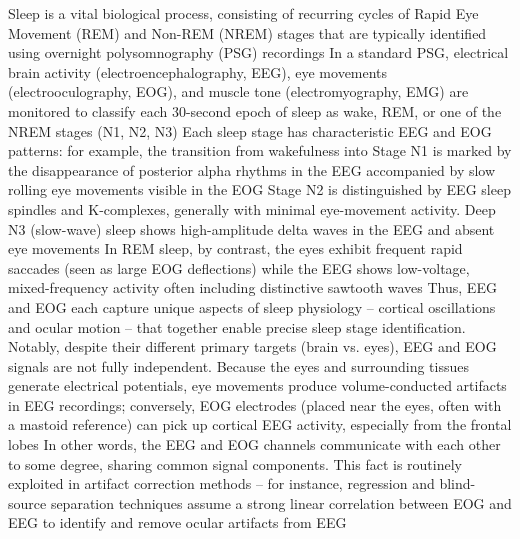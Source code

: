 Sleep is a vital biological process, consisting of recurring cycles of Rapid Eye Movement (REM) and Non-REM (NREM) stages that are typically identified using overnight polysomnography (PSG) recordings %
In a standard PSG, electrical brain activity (electroencephalography, EEG), eye movements (electrooculography, EOG), and muscle tone (electromyography, EMG) are monitored to classify each 30-second epoch of sleep as wake, REM, or one of the NREM stages (N1, N2, N3) %
Each sleep stage has characteristic EEG and EOG patterns: for example, the transition from wakefulness into Stage N1 is marked by the disappearance of posterior alpha rhythms in the EEG accompanied by slow rolling eye movements visible in the EOG %
Stage N2 is distinguished by EEG sleep spindles and K-complexes, generally with minimal eye-movement activity. Deep N3 (slow-wave) sleep shows high-amplitude delta waves in the EEG and absent eye movements %
In REM sleep, by contrast, the eyes exhibit frequent rapid saccades (seen as large EOG deflections) while the EEG shows low-voltage, mixed-frequency activity often including distinctive sawtooth waves %
Thus, EEG and EOG each capture unique aspects of sleep physiology – cortical oscillations and ocular motion – that together enable precise sleep stage identification. Notably, despite their different primary targets (brain vs. eyes), EEG and EOG signals are not fully independent. Because the eyes and surrounding tissues generate electrical potentials, eye movements produce volume-conducted artifacts in EEG recordings; conversely, EOG electrodes (placed near the eyes, often with a mastoid reference) can pick up cortical EEG activity, especially from the frontal lobes %
In other words, the EEG and EOG channels communicate with each other to some degree, sharing common signal components. This fact is routinely exploited in artifact correction methods – for instance, regression and blind-source separation techniques assume a strong linear correlation between EOG and EEG to identify and remove ocular artifacts from EEG %
